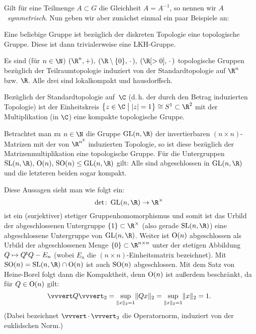 Gilt für eine Teilmenge $A\subset G$ die Gleichheit $A=A^{-1}$, so nennen wir
$A$~\emph{symmetrisch}. Nun geben wir aber zunächst einmal ein paar Beispiele an:
\begin{BspList}[\label{tg:topogrpbsp}]
\item
    Eine beliebige Gruppe ist bezüglich der diskreten Topologie eine
    topologische Gruppe. Diese ist dann trivialerweise eine LKH-Gruppe.
    
\item
    Es sind (für $n\in\N$) $(\R^n,+),\; (\R\setminus\{0\}, \,\cdot\,),\; 
    (\R[>0], \,\cdot\,)$ topologische Gruppen bezüglich der Teilraumtopologie
    induziert von der Standardtopologie auf $\R^n$ bzw. $\R$. Alle drei sind
    lokalkompakt und hausdorffsch.

\item
    Bezüglich der Standardtopologie auf~$\C$ (d.\,h. der durch den Betrag induzierten
    Topologie) ist der Einheitskreis 
    $\left\{ z\in\C \;\big\vert\; \abs{z}=1 \right\} \cong S^1 \subset \R^2$ mit
    der Multiplikation (in $\C$) eine kompakte topologische Gruppe.

\item
    Betrachtet man zu $n\in\N$ die Gruppe $\matGL(n,\R)$ der
    invertierbaren $(n\!\times\!n)$-Matrizen mit der von $\R^{n^2}$ induzierten
    Topologie, so ist diese bezüglich der Matrizenmultiplikation eine
    topologische Gruppe. Für die Untergruppen $\matSL(n,\R),\,\matO(n),\,\matSO(n)
    \leq \matGL(n,\R)$ gilt: Alle sind abgeschlossen in $\matGL(n,\R)$ und
    die letzteren beiden sogar kompakt.
    
    Diese Aussagen sieht man wie folgt ein:
    \[ \det\colon\matGL(n,\R)\to\R^\times 
    \] 
    ist ein (surjektiver) stetiger Gruppenhomomorphismus und somit ist das
    Urbild der abgeschlossenen Untergruppe $\{1\} \subset \R^\times$ (also
    gerade $\matSL(n,\R)$) eine abgeschlossene Untergruppe von $\matGL(n,\R)$.
    Weiter ist $\operatorname{O}(n)$ abgeschlossen als Urbild der abgeschlossenen Menge
    $\{0\} \subset \R^{n\times n}$ unter der stetigen Abbildung $Q\mapsto Q^\mathsf{t} Q - E_n$
    (wobei $E_n$ die $(n\!\times\!n)$-Einheitsmatrix bezeichnet). Mit $\matSO(n)
    = \matSL(n,\R) \cap \matO(n)$ ist auch $\operatorname{SO}(n)$ abgeschlossen.
    Mit dem Satz von Heine-Borel folgt dann die Kompaktheit, denn $\operatorname{O}(n)$ ist
    außerdem beschränkt, da für $Q\in\operatorname{O}(n)$ gilt: 
    \[ \opnorm{Q}_2 = \sup_{\norm{x}_2=1} \norm{Qx}_2 
        = \sup_{\norm{x}_2=1} \norm{x}_2 = 1
    . \]
    (Dabei bezeichnet $\opnorm{\,\cdot\,}_2$ die Operatornorm, induziert von der
    euklidschen Norm.)
    

\end{BspList}
